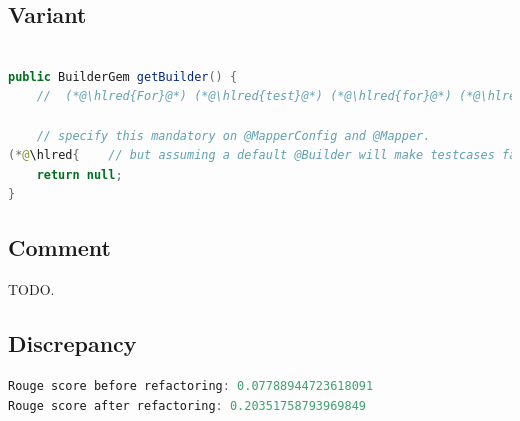 \documentclass[usenames,dvipsnames]{article} %
\DeclareRobustCommand{\hlred}[1]{{\sethlcolor{pink}\hl{#1}}}
\begin{document}
  \subsection{Variant}

  \begin{lstlisting}[language=java]

public BuilderGem getBuilder() {
    //  (*@\hlred{For}@*) (*@\hlred{test}@*) (*@\hlred{for}@*) (*@\hlred{a}@*) (*@\hlred{method}@*) (*@\hlred{that}@*) (*@\hlred{that's}@*) (*@\hlred{this}@*) (*@\hlred{case}@*) (*@\hlred{is}@*) (*@\hlred{an}@*) (*@\hlred{Java}@*) (*@\hlred{class}@*) (*@\hlred{class}@*) (*@\hlred{as}@*) (*@\hlred{not}@*) (*@\hlred{an}@*) (*@\hlred{instance}@*)

    // specify this mandatory on @MapperConfig and @Mapper.
(*@\hlred{    // but assuming a default @Builder will make testcases fail. Not having a default means that you need to}@*)
    return null;
}
  \end{lstlisting}

  \subsection{Comment}

  TODO.

  \subsection{Discrepancy}

  \begin{lstlisting}[language=java]
Rouge score before refactoring: 0.07788944723618091
Rouge score after refactoring: 0.20351758793969849
  \end{lstlisting}
\end{document}
